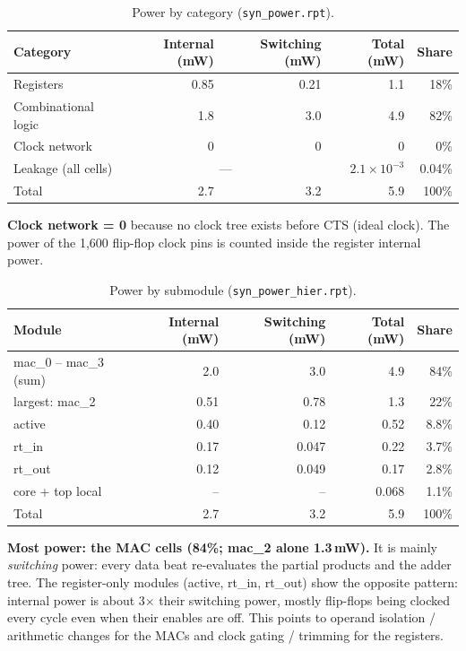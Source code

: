 \begin{table}[H]
\centering
\small
\begin{tabular}{lrrrr}
\toprule
Category & Internal (mW) & Switching (mW) & Total (mW) & Share \\
\midrule
Registers           & 0.85 & 0.21 & 1.1 & 18\% \\
Combinational logic & 1.8  & 3.0  & 4.9 & 82\% \\
Clock network       & 0    & 0    & 0   & 0\%  \\
Leakage (all cells) & \multicolumn{2}{c}{---} & $2.1\times10^{-3}$ & 0.04\% \\
\midrule
Total               & 2.7  & 3.2  & 5.9 & 100\% \\
\bottomrule
\end{tabular}
\caption{Power by category (\texttt{syn\_power.rpt}).}
\end{table}

\textbf{Clock network = 0} because no clock tree exists before CTS (ideal clock).
The power of the 1,600 flip-flop clock pins is counted inside the register internal power.

\begin{table}[H]
\centering
\small
\begin{tabular}{lrrrr}
\toprule
Module & Internal (mW) & Switching (mW) & Total (mW) & Share \\
\midrule
mac\_0 -- mac\_3 (sum)       & 2.0  & 3.0  & 4.9  & 84\% \\
\quad largest: mac\_2        & 0.51 & 0.78 & 1.3  & 22\% \\
active                       & 0.40 & 0.12 & 0.52 & 8.8\% \\
rt\_in                       & 0.17 & 0.047 & 0.22 & 3.7\% \\
rt\_out                      & 0.12 & 0.049 & 0.17 & 2.8\% \\
core + top local             & --   & --   & 0.068 & 1.1\% \\
\midrule
Total                        & 2.7  & 3.2  & 5.9  & 100\% \\
\bottomrule
\end{tabular}
\caption{Power by submodule (\texttt{syn\_power\_hier.rpt}).}
\end{table}

\textbf{Most power: the MAC cells (84\%; mac\_2 alone 1.3\,mW).} It is mainly \emph{switching}
power: every data beat re-evaluates the partial products and the adder tree.
The register-only modules (active, rt\_in, rt\_out) show the opposite pattern: internal power is
about 3$\times$ their switching power, mostly flip-flops being clocked every cycle even when their
enables are off. This points to operand isolation / arithmetic changes for the MACs and
clock gating / trimming for the registers.

